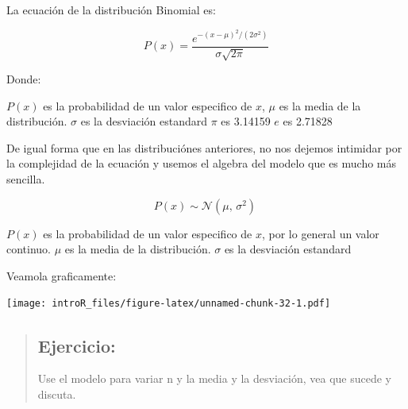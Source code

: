 \documentclass[
]{book}
\newenvironment{Shaded}{\begin{snugshade}}{\end{snugshade}}
\newcommand{\CommentTok}[1]{\textcolor[rgb]{0.56,0.35,0.01}{\textit{#1}}}
\newcommand{\DataTypeTok}[1]{\textcolor[rgb]{0.13,0.29,0.53}{#1}}
\newcommand{\DecValTok}[1]{\textcolor[rgb]{0.00,0.00,0.81}{#1}}
\newcommand{\FloatTok}[1]{\textcolor[rgb]{0.00,0.00,0.81}{#1}}
\newcommand{\KeywordTok}[1]{\textcolor[rgb]{0.13,0.29,0.53}{\textbf{#1}}}
\newcommand{\NormalTok}[1]{#1}
\newcommand{\OperatorTok}[1]{\textcolor[rgb]{0.81,0.36,0.00}{\textbf{#1}}}
\newcommand{\StringTok}[1]{\textcolor[rgb]{0.31,0.60,0.02}{#1}}
\begin{document}
La ecuación de la distribución Binomial es:

\begin{equation} 
P\left(x \right) =  \frac{e^{-(x - \mu)^{2}/(2\sigma^{2}) }} {\sigma\sqrt{2\pi}}
\label{eq:norm}
\end{equation}

Donde:

\(P(x)\) es la probabilidad de un valor especifico de \(x\),
\(\mu\) es la media de la distribución.
\(\sigma\) es la desviación estandard
\(\pi\) es 3.14159
\(e\) es 2.71828

De igual forma que en las distribuciónes anteriores, no nos dejemos intimidar por la complejidad de la ecuación y usemos el algebra del modelo que es mucho más sencilla.

\begin{equation} 
  P\left( x \right) \sim \mathcal{N}(\mu,\,\sigma^{2})\
  \label{eq:binom}
\end{equation}

\(P(x)\) es la probabilidad de un valor especifico de \(x\), por lo general un valor continuo.
\(\mu\) es la media de la distribución.
\(\sigma\) es la desviación estandard

Veamola graficamente:

\begin{Shaded}
\end{Shaded}

\texttt{[image: introR\_files/figure-latex/unnamed-chunk-32-1.pdf]}

\begin{quote}
\hypertarget{ejercicio-8}{%
\subsection{Ejercicio:}\label{ejercicio-8}}

Use el modelo para variar n y la media y la desviación, vea que sucede y discuta.
\end{quote}

  
\end{document}

